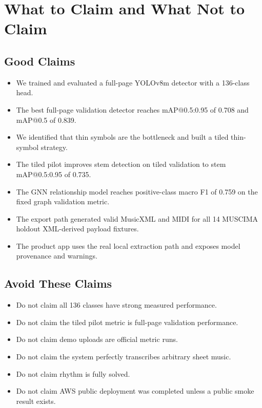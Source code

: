 \documentclass[11pt]{article}
\begin{document}
\section{What to Claim and What Not to Claim}

\subsection{Good Claims}

\begin{itemize}
  \item We trained and evaluated a full-page YOLOv8m detector with a 136-class head.
  \item The best full-page validation detector reaches mAP@0.5:0.95 of 0.708 and mAP@0.5 of 0.839.
  \item We identified that thin symbols are the bottleneck and built a tiled thin-symbol strategy.
  \item The tiled pilot improves stem detection on tiled validation to stem mAP@0.5:0.95 of 0.735.
  \item The GNN relationship model reaches positive-class macro F1 of 0.759 on the fixed graph validation metric.
  \item The export path generated valid MusicXML and MIDI for all 14 MUSCIMA holdout XML-derived payload fixtures.
  \item The product app uses the real local extraction path and exposes model provenance and warnings.
\end{itemize}

\subsection{Avoid These Claims}

\begin{itemize}
  \item Do not claim all 136 classes have strong measured performance.
  \item Do not claim the tiled pilot metric is full-page validation performance.
  \item Do not claim demo uploads are official metric runs.
  \item Do not claim the system perfectly transcribes arbitrary sheet music.
  \item Do not claim rhythm is fully solved.
  \item Do not claim AWS public deployment was completed unless a public smoke result exists.
\end{itemize}
\end{document}
